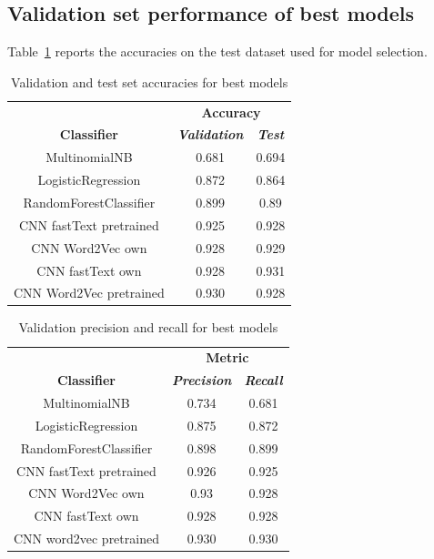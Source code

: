 \documentclass[conference]{IEEEtran}
\begin{document}
\subsection{Validation set performance of best models}
Table~\ref{tab1} reports the accuracies on the test dataset used for model selection.

\begin{table}[htbp]
\caption{Validation and test set accuracies for best models}
\begin{center}
\begin{tabular}{|c|c|c|}
\hline
\textbf{}&\multicolumn{2}{|c|}{\textbf{Accuracy}} \\ 
\cline{2-3}
\textbf{Classifier} & \textbf{\textit{Validation}}& \textbf{\textit{Test}} \\ 
\hline
MultinomialNB & 0.681 & 0.694 \\ 
\hline
LogisticRegression & 0.872 & 0.864 \\ 
\hline
RandomForestClassifier & 0.899 & 0.89 \\ 
\hline
CNN fastText pretrained & 0.925 & 0.928 \\ 
\hline
CNN Word2Vec own & 0.928 & 0.929 \\ 
\hline
CNN fastText own & 0.928 & 0.931 \\ 
\hline
CNN Word2Vec pretrained & 0.930 & 0.928 \\ 
\hline
\end{tabular}
\label{tab1}
\end{center}
\end{table}

\begin{table}[htbp]
\caption{Validation precision and recall for best models}
\begin{center}
\begin{tabular}{|c|c|c|}
\hline
\textbf{}&\multicolumn{2}{|c|}{\textbf{Metric}} \\ 
\cline{2-3}
\textbf{Classifier} & \textbf{\textit{Precision}}& \textbf{\textit{Recall}} \\ 
\hline
MultinomialNB & 0.734 & 0.681 \\ 
\hline
LogisticRegression & 0.875 & 0.872 \\ 
\hline
RandomForestClassifier & 0.898 & 0.899 \\ 
\hline
CNN fastText pretrained & 0.926 & 0.925 \\ 
\hline
CNN Word2Vec own & 0.93 & 0.928 \\ 
\hline
CNN fastText own & 0.928 & 0.928 \\ 
\hline
CNN word2vec pretrained & 0.930 & 0.930 \\ 
\hline
\end{tabular}
\label{tab2}
\end{center}
\end{table}
\end{document}
